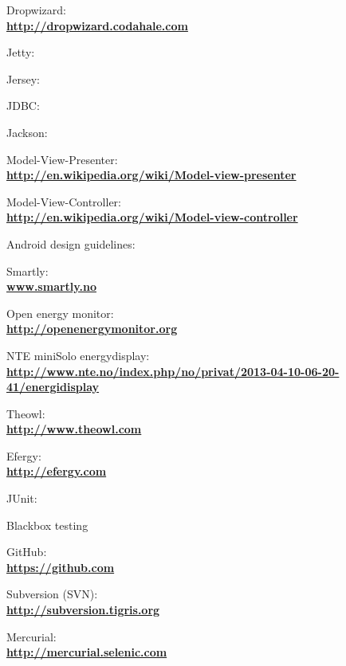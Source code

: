 \begin{thebibliography}{1}
 Dropwizard:\\
\textbf{ \url{http://dropwizard.codahale.com}}

 Jetty:\\
\textbf{ \url{}}

 Jersey:\\
\textbf{ \url{}}

 JDBC:\\
\textbf{ \url{}}

 Jackson:\\
\textbf{ \url{}}

 Model-View-Presenter:\\
\textbf{ \url{http://en.wikipedia.org/wiki/Model-view-presenter}}

 Model-View-Controller:\\
\textbf{ \url{http://en.wikipedia.org/wiki/Model-view-controller}}

 Android design guidelines:\\
\textbf{ \url{}}

        
 Smartly: \\
\textbf{ \url{www.smartly.no}}

 Open energy monitor:\\
\textbf{ \url{http://openenergymonitor.org}}

 NTE miniSolo energydisplay:\\
\textbf{ \url{http://www.nte.no/index.php/no/privat/2013-04-10-06-20-41/energidisplay}}

 Theowl:\\
\textbf{ \url{http://www.theowl.com}}


 Efergy:\\
\textbf{ \url{http://efergy.com}}

 JUnit: \\
\textbf{ \url{}}

 Blackbox testing\\
\textbf{ \url{}}

 GitHub:\\
\textbf{ \url{https://github.com}}

 Subversion (SVN):\\
\textbf{ \url{http://subversion.tigris.org}}

 Mercurial:\\
\textbf{ \url{http://mercurial.selenic.com}}


\end{thebibliography}
